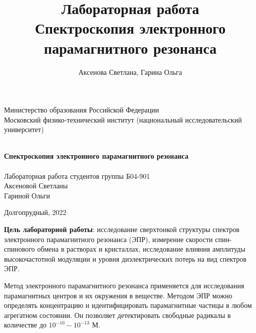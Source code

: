 \documentclass[a4paper,14pt]{article}
\author{Аксенова Светлана, Гарина Ольга}
\title{Лабораторная работа \\ Спектроскопия электронного парамагнитного резонанса}
\begin{document}
	\begin{titlepage}
		
		\begin{center}
			\vfill
			
			Министерство образования Российской Федерации\\
			Московский физико-технический институт (национальный исследовательский университет)\\
			\ \\
			\hfill
			
			\vfill
		
			
			{\large\bf Спектроскопия электронного парамагнитного резонанса\\}
			\ \\
		Лабораторная работа студентов группы Б04-901 \\
			Аксеновой Светланы\\
			Гариной Ольги
			
			\vfill
			
			
			
			\vfill
			
			Долгопрудный, 2022
		\end{center}
		
	\end{titlepage}
	\newpage
	\tableofcontents	
	\newpage
\textbf{Цель лабораторной работы}: исследование
сверхтонкой структуры спектров электронного парамагнитного резонанса (ЭПР), измерение скорости спин-спинового обмена в растворах и кристаллах, исследование влияния амплитуды высокочастотной модуляции и уровня диэлектрических потерь на вид спектров ЭПР.
\par 
Метод электронного парамагнитного резонанса применяется для исследования парамагнитных центров и их окружения в веществе. Методом ЭПР можно определять концентрацию и идентифицировать парамагнитные частицы в любом агрегатном состоянии. Он позволяет детектировать свободные радикалы в количестве до $ 10^{-10} - 10^{-13} $ М.
\end{document}
